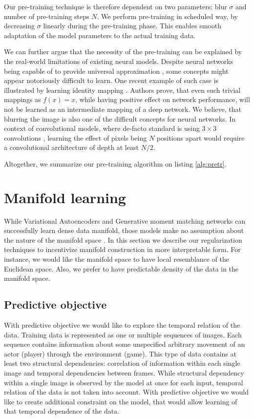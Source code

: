 Our pre-training technique is therefore dependent on two parameters: blur $\sigma$ and number of pre-training steps $N$.
We perform pre-training in scheduled way, by decreasing $\sigma$ linearly during the pre-training phase.
This enables smooth adaptation of the model parameters to the actual training data.

We can further argue that the necessity of the pre-training can be explained by the real-world limitations of existing neural models.
Despite neural networks being capable of to provide universal approximation \cite{Debao1993}, some concepts might appear notoriously difficult to learn.
One recent example of such case is illustrated by learning identity mapping \cite{He2015}.
Authors prove, that even such trivial mappings as $f(x)=x$, while having positive effect on network performance, will not be learned as an intermediate mapping of a deep network.
We believe, that blurring the image is also one of the difficult concepts for neural networks.
In context of convolutional models, where de-facto standard is using $3 \times 3$ convolutions \cite{Szegedy2016a}, learning the effect of pixels being $N$ positions apart would require a convolutional architecture of depth at least $N/2$.

Altogether, we summarize our pre-training algorithm on listing \ref{alg:pretr}.



\section{Manifold learning}\label{ss:mf}

While Variational Autoencoders and Generative moment matching networks can successfully learn dense data manifold, those models make no assumption about the nature of the manifold space \cite{Li2015, Ren2016, Kingma2013}.
In this section we describe our regularization techniques to incentivize manifold construction in more interpretable form.
For instance, we would like the manifold space to have local resemblance of the Euclidean space.
Also, we prefer to have predictable density of the data in the manifold space.

\subsection{Predictive objective}

With predictive objective we would like to explore the temporal relation of the data.
Training data is represented as one or multiple sequences of images.
Each sequence contains information about some unspecified arbitrary movement of an actor (player) through the environment (game).
This type of data contains at least two structural dependencies: correlation of information within each single image and temporal dependencies between frames.
While structural dependency within a single image is observed by the model at once for each input, temporal relation of the data is not taken into account.
With predictive objective we would like to create additional constraint on the model, that would allow learning of that temporal dependence of the data.

